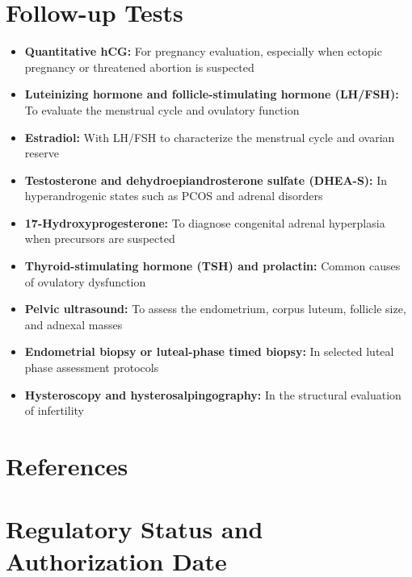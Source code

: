 \section*{Follow-up Tests}
\begin{itemize}
  \item \textbf{Quantitative hCG:} For pregnancy evaluation, especially when ectopic pregnancy or threatened abortion is suspected
  \item \textbf{Luteinizing hormone and follicle-stimulating hormone (LH/FSH):} To evaluate the menstrual cycle and ovulatory function
  \item \textbf{Estradiol:} With LH/FSH to characterize the menstrual cycle and ovarian reserve
  \item \textbf{Testosterone and dehydroepiandrosterone sulfate (DHEA-S):} In hyperandrogenic states such as PCOS and adrenal disorders
  \item \textbf{17-Hydroxyprogesterone:} To diagnose congenital adrenal hyperplasia when precursors are suspected
  \item \textbf{Thyroid-stimulating hormone (TSH) and prolactin:} Common causes of ovulatory dysfunction
  \item \textbf{Pelvic ultrasound:} To assess the endometrium, corpus luteum, follicle size, and adnexal masses
  \item \textbf{Endometrial biopsy or luteal-phase timed biopsy:} In selected luteal phase assessment protocols
  \item \textbf{Hysteroscopy and hysterosalpingography:} In the structural evaluation of infertility
\end{itemize}

\section*{References}



\clearpage
\section*{Regulatory Status and Authorization Date}

\clearpage
